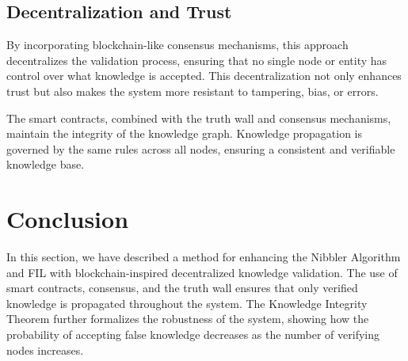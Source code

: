 \subsection{Decentralization and Trust}
By incorporating blockchain-like consensus mechanisms, this approach decentralizes the validation process, ensuring that no single node or entity has control over what knowledge is accepted. This decentralization not only enhances trust but also makes the system more resistant to tampering, bias, or errors.

The smart contracts, combined with the truth wall and consensus mechanisms, maintain the integrity of the knowledge graph. Knowledge propagation is governed by the same rules across all nodes, ensuring a consistent and verifiable knowledge base.

\section{Conclusion}

In this section, we have described a method for enhancing the Nibbler Algorithm and FIL with blockchain-inspired decentralized knowledge validation. The use of smart contracts, consensus, and the truth wall ensures that only verified knowledge is propagated throughout the system. The Knowledge Integrity Theorem further formalizes the robustness of the system, showing how the probability of accepting false knowledge decreases as the number of verifying nodes increases.
